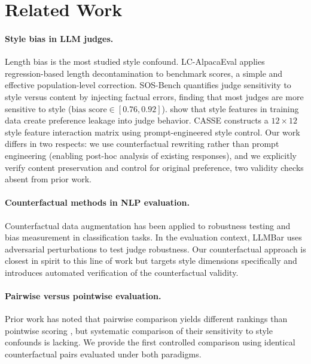 \documentclass[11pt,a4paper]{article}
\begin{document}
\section{Related Work}

\paragraph{Style bias in LLM judges.}
Length bias is the most studied style confound.
LC-AlpacaEval \citep{lcalpacaeval2025} applies regression-based length decontamination to benchmark scores, a simple and effective population-level correction.
SOS-Bench \citep{sosbench2025} quantifies judge sensitivity to style versus content by injecting factual errors, finding that most judges are more sensitive to style ($\text{bias score} \in [0.76, 0.92]$).
\citet{preferenceleakage2026} show that style features in training data create preference leakage into judge behavior.
CASSE \citep{casse2026} constructs a $12 \times 12$ style feature interaction matrix using prompt-engineered style control.
Our work differs in two respects: we use counterfactual rewriting rather than prompt engineering (enabling post-hoc analysis of existing responses), and we explicitly verify content preservation and control for original preference, two validity checks absent from prior work.

\paragraph{Counterfactual methods in NLP evaluation.}
Counterfactual data augmentation has been applied to robustness testing \citep{kaushik2020learning} and bias measurement in classification tasks.
In the evaluation context, LLMBar \citep{llmbar2024} uses adversarial perturbations to test judge robustness.
Our counterfactual approach is closest in spirit to this line of work but targets style dimensions specifically and introduces automated verification of the counterfactual validity.

\paragraph{Pairwise versus pointwise evaluation.}
Prior work has noted that pairwise comparison yields different rankings than pointwise scoring \citep{zheng2023judging}, but systematic comparison of their sensitivity to style confounds is lacking.
We provide the first controlled comparison using identical counterfactual pairs evaluated under both paradigms.
\end{document}
